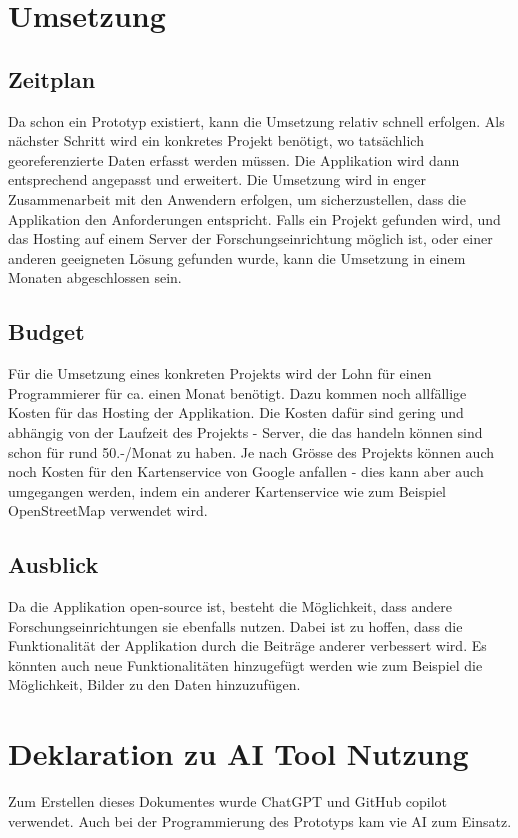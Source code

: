 \documentclass{article}
\begin{document}
\newpage

\section{Umsetzung} %

\subsection{Zeitplan} %

Da schon ein Prototyp existiert, kann die Umsetzung relativ schnell erfolgen. Als nächster Schritt wird
ein konkretes Projekt benötigt, wo tatsächlich georeferenzierte Daten erfasst werden müssen. Die Applikation
wird dann entsprechend angepasst und erweitert. Die Umsetzung wird in enger Zusammenarbeit mit den
Anwendern erfolgen, um sicherzustellen, dass die Applikation den Anforderungen entspricht.
Falls ein Projekt gefunden wird, und das Hosting auf einem Server der Forschungseinrichtung möglich ist,
oder einer anderen geeigneten Lösung gefunden wurde, kann die Umsetzung in einem Monaten abgeschlossen sein.

\subsection{Budget} %

Für die Umsetzung eines konkreten Projekts wird der Lohn für einen Programmierer für ca. einen Monat benötigt.
Dazu kommen noch allfällige Kosten für das Hosting der Applikation. Die Kosten dafür sind gering und
abhängig von der Laufzeit des Projekts - Server, die das handeln können sind schon für rund 50.-/Monat zu haben.
Je nach Grösse des Projekts können auch noch Kosten für den
Kartenservice von Google anfallen - dies kann aber auch umgegangen werden, indem ein anderer Kartenservice
wie zum Beispiel OpenStreetMap verwendet wird.

\subsection{Ausblick} %

Da die Applikation open-source ist, besteht die Möglichkeit, dass andere Forschungseinrichtungen
sie ebenfalls nutzen. Dabei ist zu hoffen, dass die Funktionalität der Applikation durch die
Beiträge anderer verbessert wird. Es könnten auch neue Funktionalitäten hinzugefügt werden wie zum
Beispiel die Möglichkeit, Bilder zu den Daten hinzuzufügen.

\section*{Deklaration zu AI Tool Nutzung} %

Zum Erstellen dieses Dokumentes wurde ChatGPT und GitHub copilot verwendet.
Auch bei der Programmierung des Prototyps kam vie AI zum Einsatz.
\end{document}
